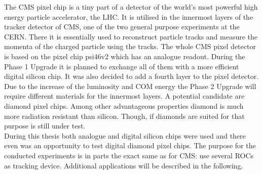 \documentclass[british,11pt,a4paper]{memoir}
\begin{document}

The CMS pixel chip is a tiny part of a detector of the world's most powerful high energy particle accelerator, the \ac{LHC}. It is utilised in the innermost layers of the tracker detector of \ac{CMS}, one of the two general purpose experiments at the \ac{CERN}. There it is essentially used to reconstruct particle tracks and measure the momenta of the charged particle using the tracks. The whole \ac{CMS} pixel detector is based on the pixel chip psi46v2 which has an analogue readout. During the Phase 1 Upgrade it is planned to exchange all of them with a more efficient digital silicon chip. It was also decided to add a fourth layer to the pixel detector. Due to the increase of the luminosity and \ac{COM} energy the Phase 2 Upgrade will require different materials for the innermost layers. A potential candidate are diamond pixel chips. Among other advantageous properties diamond is much more radiation resistant than silicon. Though, if diamonds are suited for that purpose is still under test.\\
During this thesis both analogue and digital silicon chips were used and there even was an opportunity to test digital diamond pixel chips. The purpose for the conducted experiments is in parts the exact same as for \ac{CMS}: use several \ac{ROC}s as tracking device. Additional applications will be described in the following.
\end{document}
